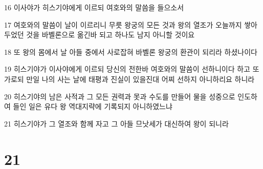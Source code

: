 \par 16 이사야가 히스기야에게 이르되 여호와의 말씀을 들으소서
\par 17 여호와의 말씀이 날이 이르리니 무릇 왕궁의 모든 것과 왕의 열조가 오늘까지 쌓아 두었던 것을 바벨론으로 옮긴바 되고 하나도 남지 아니할 것이요
\par 18 또 왕의 몸에서 날 아들 중에서 사로잡혀 바벨론 왕궁의 환관이 되리라 하셨나이다
\par 19 히스기야가 이사야에게 이르되 당신의 전한바 여호와의 말씀이 선하니이다 하고 또 가로되 만일 나의 사는 날에 태평과 진실이 있을진대 어찌 선하지 아니하리요 하니라
\par 20 히스기야의 남은 사적과 그 모든 권력과 못과 수도를 만들어 물을 성중으로 인도하여 들인 일은 유다 왕 역대지략에 기록되지 아니하였느냐
\par 21 히스기야가 그 열조와 함께 자고 그 아들 므낫세가 대신하여 왕이 되니라

\chapter{21}

